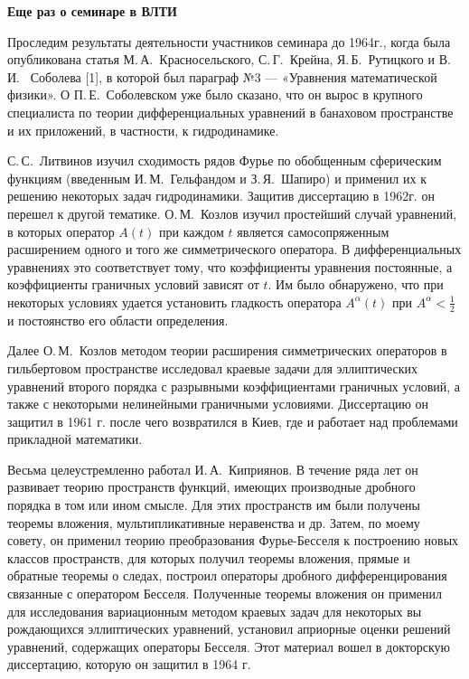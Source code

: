 {\bf Еще раз о семинаре в ВЛТИ}

Проследим результаты деятельности участников семинара до 1964г., когда была опубликована статья М.\,А.~Красносельского, С.\,Г.~Крейна, Я.\,Б.~Рутицкого и В.\,И.~ Соболева [1], в которой был параграф №3 --- «Уравнения математической физики». О П.\,Е.~Соболевском уже было сказано, что он вырос в крупного
специалиста по теории дифференциальных уравнений в банаховом пространстве и их приложений, в частности, к гидродинамике.

С.\,С.~Литвинов изучил сходимость рядов Фурье по обобщенным сферическим функциям
(введенным И.\,М.~Гель\-фа\-н\-дом и З.\,Я.~Шапиро) и применил их к решению некоторых задач гидродинамики. Защитив диссертацию в 1962г. он перешел к другой тематике. О.\,М.~Козлов изучил простейший случай уравнений, в которых оператор $A(t)$ при каждом $t$ является самосопряженным расширением одного и того же симметрического оператора. В дифференциальных уравнениях это соответствует тому, что коэффициенты уравнения постоянные, а коэффициенты граничных условий зависят от $t$. Им было обнаружено, что при некоторых условиях удается установить гладкость оператора $A^{\alpha}(t)$ при $A^{\alpha} < \frac{1}{2}$  и постоянство его области определения.

Далее О.\,М.~Козлов методом теории расширения симметрических операторов в гильбертовом пространстве исследовал краевые задачи для эллиптических уравнений второго порядка с разрывными коэффициентами граничных условий, а также с некоторыми нелинейными граничными условиями. Диссертацию он защитил в 1961 г. после чего возвратился в Киев, где и работает над проблемами прикладной математики.

Весьма целеустремленно работал И.\,А.~Киприянов. В течение ряда лет он развивает теорию пространств функций, имеющих производные дробного порядка в том или ином смысле. Для этих пространств им были получены теоремы вложения, мультипликативные неравенства и др. Затем, по моему совету, он применил теорию преобразования
Фурье-Бесселя к построению новых классов пространств, для которых получил теоремы вложения, прямые и обратные теоремы о следах, построил операторы дробного дифференцирования связанные с оператором Бесселя. Полученные теоремы вложения он применил для исследования вариационным методом краевых задач для некоторых вы рождающихся эллиптических уравнений, установил априорные оценки решений уравнений, содержащих операторы Бесселя. Этот материал вошел в докторскую диссертацию, которую он защитил в 1964 г.

